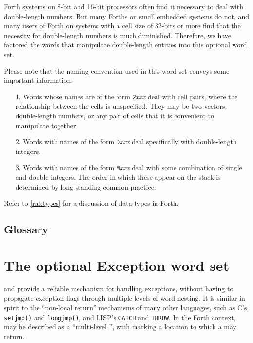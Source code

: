 Forth systems on 8-bit and 16-bit processors often find it necessary
to deal with double-length numbers. But many Forths on small embedded
systems do not, and many users of Forth on systems with a cell size of
32-bits or more find that the necessity for double-length numbers is
much diminished. Therefore, we have factored the words that manipulate
double-length entities into this optional word set.

Please note that the naming convention used in this word set conveys
some important information:

\begin{enumerate}
\item[1.]
	Words whose names are of the form \texttt{2}\emph{xxx} deal
	with cell pairs, where the relationship between the cells is
	unspecified. They may be two-vectors, double-length numbers, or
	any pair of cells that it is convenient to manipulate together.

\item[2.]
	Words with names of the form \texttt{D}\emph{xxx} deal
	specifically with double-length integers.

\item[3.]
	Words with names of the form \texttt{M}\emph{xxx} deal with
	some combination of single and double integers. The order in
	which these appear on the stack is determined by long-standing
	common practice.
\end{enumerate}

Refer to \ref{rat:types} for a discussion of data types in Forth.

\setcounter{subsection}{5}
\subsection{Glossary} %



\section{The optional Exception word set} %
\label{rat:exception}

 and  provide a reliable mechanism for
handling exceptions, without having to propagate exception flags
through multiple levels of word nesting. It is similar in spirit
to the ``non-local return'' mechanisms of many other languages,
such as C's \texttt{setjmp()} and \texttt{longjmp()}, and LISP's
\texttt{CATCH} and \texttt{THROW}. In the Forth context, 
may be described as a ``multi-level '', with
 marking a location to which a  may return.

